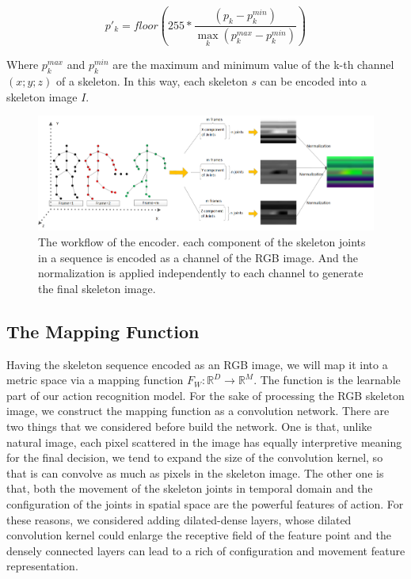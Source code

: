 \documentclass{bmvc2k}
\begin{document}
$$p'_k=floor(255*\frac{(p_k-p^{min}_k)}{\max \limits_{k}(p_k^{max}-p_k^{min})})$$

Where $p^{max}_k$ and $p^{min}_k$ are the maximum and minimum value of the k-th channel $(x; y; z)$ of a skeleton. In this way, each skeleton $s$ can be encoded into a skeleton image $I$. 

\begin{figure}[htb] 
	\centering
	\includegraphics[scale=0.25]{images/Figure_2.png}
	\caption{The workflow of the encoder. each component of the skeleton joints in a sequence is encoded as a channel of the RGB image. And the normalization is applied independently to each channel to generate the final skeleton image.}
	\label{fig:2}	
\end{figure}

\subsection*{The Mapping Function}
Having the skeleton sequence encoded as an RGB image, we will map it into a metric space via a mapping function $F_W:\mathbb{R}^D\rightarrow \mathbb{R}^M$. The function is the learnable part of our action recognition model. For the sake of processing the RGB skeleton image, we construct the mapping function as a convolution network. There are two things that we considered before build the network. One is that, unlike natural image, each pixel scattered in the image has equally interpretive meaning for the final decision, we tend to expand the size of the convolution kernel, so that is can convolve as much as pixels in the skeleton image. The other one is that, both the movement of the skeleton joints in temporal domain and the configuration of the joints in spatial space are the powerful features of action. For these reasons, we considered adding dilated-dense layers, whose dilated convolution kernel could enlarge the receptive field of the feature point and the densely connected layers can lead to a rich of configuration and movement feature representation. 
\end{document}
